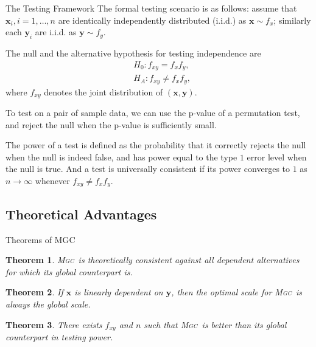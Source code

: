 \documentclass{beamer}
\newtheorem{thm}{Theorem}
\providecommand{\mb}[1]{\boldsymbol{#1}}
\providecommand{\sct}[1]{{\normalfont\textsc{#1}}}
\newcommand{\Mgc}{\sct{Mgc}}
\begin{document}
\begin{frame}{The Testing Framework}
The formal testing scenario is as follows: assume that $\mb{x}_i, i=1,\ldots,n$ are identically independently distributed (i.i.d.) as $\mb{x} \sim f_{x}$; similarly each $\mb{y}_{i}$ are i.i.d. as $\mb{y} \sim f_{y}$. 

\pause
\medskip
The null and the alternative hypothesis for testing independence are
\begin{align*}
& H_{0}: f_{xy}=f_{x}f_{y},\\
& H_{A}: f_{xy} \neq f_{x}f_{y},
\end{align*}
where $f_{xy}$ denotes the joint distribution of $(\mb{x},\mb{y})$. 

\pause
\medskip
To test on a pair of sample data, we can use the p-value of a permutation test, and reject the null when the p-value is sufficiently small.

\pause
\medskip
The power of a test is defined as the probability that it correctly rejects the null when the null is indeed false, and has power equal to the type $1$ error level when the null is true. And a test is universally consistent if its power converges to $1$ as $n \rightarrow \infty$ whenever $f_{xy} \neq f_x f_y$.
\end{frame}

\subsection{Theoretical Advantages}
\begin{frame}{Theorems of MGC}
\begin{thm}
\Mgc~is theoretically consistent against all dependent alternatives for which its global counterpart is. 
\end{thm}

\pause
\medskip
\begin{thm}
If $\mb{x}$ is linearly dependent on $\mb{y}$, then the optimal scale for \Mgc~is always the global scale.
\end{thm}

\pause
\medskip
\begin{thm}
There exists $f_{xy}$ and $n$ such that \Mgc~is better than its global counterpart in testing power.
\end{thm}
\end{frame}
\end{document}
